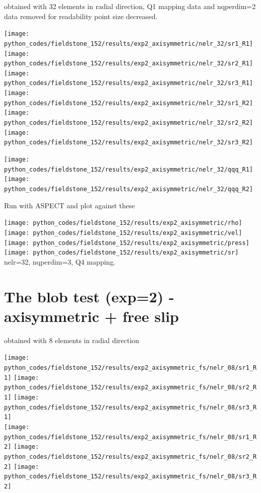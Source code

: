 \newpage

obtained with 32 elements in radial direction, Q1 mapping data and nqperdim=2 data removed for readability
point size decreased.

\begin{center}
\texttt{[image: python\_codes/fieldstone\_152/results/exp2\_axisymmetric/nelr\_32/sr1\_R1]}
\texttt{[image: python\_codes/fieldstone\_152/results/exp2\_axisymmetric/nelr\_32/sr2\_R1]}
\texttt{[image: python\_codes/fieldstone\_152/results/exp2\_axisymmetric/nelr\_32/sr3\_R1]}\\
\texttt{[image: python\_codes/fieldstone\_152/results/exp2\_axisymmetric/nelr\_32/sr1\_R2]}
\texttt{[image: python\_codes/fieldstone\_152/results/exp2\_axisymmetric/nelr\_32/sr2\_R2]}
\texttt{[image: python\_codes/fieldstone\_152/results/exp2\_axisymmetric/nelr\_32/sr3\_R2]}\\
\end{center}

\begin{center}
\texttt{[image: python\_codes/fieldstone\_152/results/exp2\_axisymmetric/nelr\_32/qqq\_R1]}
\texttt{[image: python\_codes/fieldstone\_152/results/exp2\_axisymmetric/nelr\_32/qqq\_R2]}
\end{center}

Run with ASPECT and plot against these

\newpage


\begin{center}
\texttt{[image: python\_codes/fieldstone\_152/results/exp2\_axisymmetric/rho]}
\texttt{[image: python\_codes/fieldstone\_152/results/exp2\_axisymmetric/vel]}\\
\texttt{[image: python\_codes/fieldstone\_152/results/exp2\_axisymmetric/press]}
\texttt{[image: python\_codes/fieldstone\_152/results/exp2\_axisymmetric/sr]}\\
{\captionfont nelr=32, nqperdim=3, Q4 mapping.} 
\end{center}



\newpage
\section*{The blob test (exp=2) - axisymmetric + free slip}

obtained with 8 elements in radial direction

\begin{center}
\texttt{[image: python\_codes/fieldstone\_152/results/exp2\_axisymmetric\_fs/nelr\_08/sr1\_R1]}
\texttt{[image: python\_codes/fieldstone\_152/results/exp2\_axisymmetric\_fs/nelr\_08/sr2\_R1]}
\texttt{[image: python\_codes/fieldstone\_152/results/exp2\_axisymmetric\_fs/nelr\_08/sr3\_R1]}\\
\texttt{[image: python\_codes/fieldstone\_152/results/exp2\_axisymmetric\_fs/nelr\_08/sr1\_R2]}
\texttt{[image: python\_codes/fieldstone\_152/results/exp2\_axisymmetric\_fs/nelr\_08/sr2\_R2]}
\texttt{[image: python\_codes/fieldstone\_152/results/exp2\_axisymmetric\_fs/nelr\_08/sr3\_R2]}\\
\end{center}

